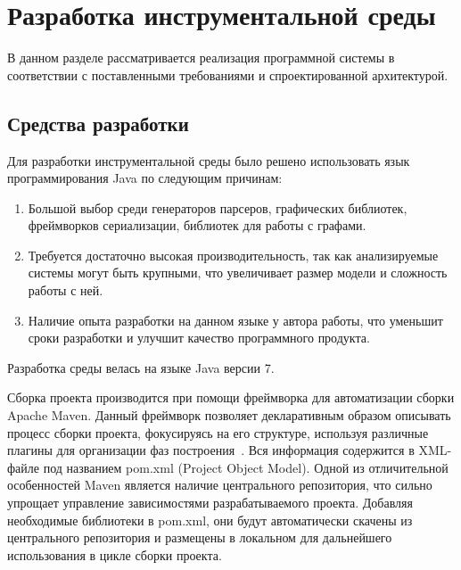 \chapter{Разработка инструментальной среды}
\label{chap:realisation}

В данном разделе рассматривается реализация программной системы в соответствии
с поставленными требованиями и спроектированной архитектурой.

\section{Средства разработки}

Для разработки инструментальной среды было решено использовать язык
программирования Java по следующим причинам:

\begin{enumerate}
    \item Большой выбор среди генераторов парсеров, графических библиотек,
    фреймворков сериализации, библиотек для работы с графами.
    \item Требуется достаточно высокая производительность, так как анализируемые
    системы могут быть крупными, что увеличивает размер модели и сложность
    работы с ней.
    \item Наличие опыта разработки на данном языке у автора  работы, что
    уменьшит сроки разработки и улучшит качество программного продукта.
\end{enumerate}

Разработка среды велась на языке Java версии 7.

Сборка проекта производится при помощи фреймворка для автоматизации сборки
Apache Maven. Данный фреймворк позволяет декларативным образом описывать процесс
сборки проекта, фокусируясь на его структуре, используя различные плагины для
организации фаз построения~\cite{Maven2001-2005}. Вся информация содержится в
XML-файле под названием pom.xml (Project Object Model). Одной из отличительной
особенностей Maven является наличие центрального репозитория, что сильно
упрощает управление зависимостями разрабатываемого проекта. Добавляя необходимые
библиотеки в pom.xml, они будут автоматически скачены из центрального
репозитория и размещены в локальном для дальнейшего использования в цикле сборки
проекта.

